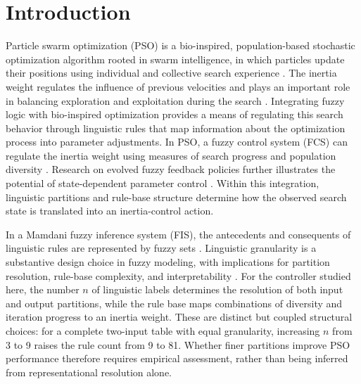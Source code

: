 \section{Introduction}
\label{sec:introduction}



Particle swarm optimization (PSO) is a bio-inspired, population-based stochastic optimization algorithm rooted in swarm intelligence, in which particles update their positions using individual and collective search experience \cite{KennedyEberhart1995}. The inertia weight regulates the influence of previous velocities and plays an important role in balancing exploration and exploitation during the search \cite{ShiEberhart1998}. Integrating fuzzy logic with bio-inspired optimization provides a means of regulating this search behavior through linguistic rules that map information about the optimization process into parameter adjustments. In PSO, a fuzzy control system (FCS) can regulate the inertia weight using measures of search progress and population diversity \cite{ShiEberhart2001}. Research on evolved fuzzy feedback policies further illustrates the potential of state-dependent parameter control \cite{Roy2024}. Within this integration, linguistic partitions and rule-base structure determine how the observed search state is translated into an inertia-control action.


In a Mamdani fuzzy inference system (FIS), the antecedents and consequents of linguistic rules are represented by fuzzy sets \cite{Gacto2011}. Linguistic granularity is a substantive design choice in fuzzy modeling, with implications for partition resolution, rule-base complexity, and interpretability \cite{Castiello2019,Gacto2011}. For the controller studied here, the number $n$ of linguistic labels determines the resolution of both input and output partitions, while the rule base maps combinations of diversity and iteration progress to an inertia weight. These are distinct but coupled structural choices: for a complete two-input table with equal granularity, increasing $n$ from 3 to 9 raises the rule count from 9 to 81. Whether finer partitions improve PSO performance therefore requires empirical assessment, rather than being inferred from representational resolution alone.


